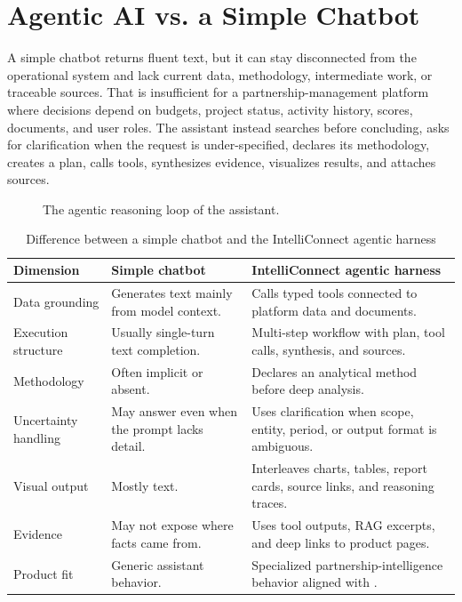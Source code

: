 \section{Agentic AI vs. a Simple Chatbot}
A simple chatbot returns fluent text, but it can stay disconnected from the operational system and lack current data, methodology, intermediate work, or traceable sources. That is insufficient for a partnership-management platform where decisions depend on budgets, project status, activity history, scores, documents, and user roles. The \projectname{} assistant instead searches before concluding, asks for clarification when the request is under-specified, declares its methodology, creates a plan, calls tools, synthesizes evidence, visualizes results, and attaches sources.
\begin{figure}[htbp]
  \centering
  \caption{The agentic reasoning loop of the \projectname{} assistant.}
  \label{fig:agent-loop}
\end{figure}
\begin{table}[H]
  \centering
  \caption{Difference between a simple chatbot and the IntelliConnect agentic harness}
  \begin{tabularx}{\textwidth}{>{\raggedright\arraybackslash}p{3.5cm}XX}
    \toprule
    Dimension & Simple chatbot & IntelliConnect agentic harness \\
    \midrule
    Data grounding & Generates text mainly from model context. & Calls typed tools connected to platform data and documents. \\
    Execution structure & Usually single-turn text completion. & Multi-step workflow with plan, tool calls, synthesis, and sources. \\
    Methodology & Often implicit or absent. & Declares an analytical method before deep analysis. \\
    Uncertainty handling & May answer even when the prompt lacks detail. & Uses clarification when scope, entity, period, or output format is ambiguous. \\
    Visual output & Mostly text. & Interleaves charts, tables, report cards, source links, and reasoning traces. \\
    Evidence & May not expose where facts came from. & Uses tool outputs, RAG excerpts, and deep links to product pages. \\
    Product fit & Generic assistant behavior. & Specialized partnership-intelligence behavior aligned with \projectname{}. \\
    \bottomrule
  \end{tabularx}
\end{table}
